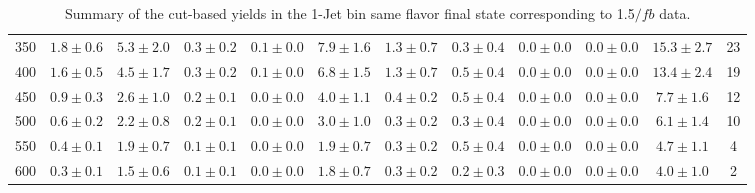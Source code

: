 \begin{table}[!hb]
{\begin{center}
\begin{tabular}{l c c c c c c c c c c c }
350 & $1.8\pm0.6$ & $5.3\pm2.0$ & $0.3\pm0.2$ & $0.1\pm0.0$ & $7.9\pm1.6$ & $1.3\pm0.7$ & $0.3\pm0.4$ & $0.0\pm0.0$ & $0.0\pm0.0$ & $15.3\pm2.7$ & 23 \\
400 & $1.6\pm0.5$ & $4.5\pm1.7$ & $0.3\pm0.2$ & $0.1\pm0.0$ & $6.8\pm1.5$ & $1.3\pm0.7$ & $0.5\pm0.4$ & $0.0\pm0.0$ & $0.0\pm0.0$ & $13.4\pm2.4$ & 19 \\
450 & $0.9\pm0.3$ & $2.6\pm1.0$ & $0.2\pm0.1$ & $0.0\pm0.0$ & $4.0\pm1.1$ & $0.4\pm0.2$ & $0.5\pm0.4$ & $0.0\pm0.0$ & $0.0\pm0.0$ & $7.7\pm1.6$ & 12 \\
500 & $0.6\pm0.2$ & $2.2\pm0.8$ & $0.2\pm0.1$ & $0.0\pm0.0$ & $3.0\pm1.0$ & $0.3\pm0.2$ & $0.3\pm0.4$ & $0.0\pm0.0$ & $0.0\pm0.0$ & $6.1\pm1.4$ & 10 \\
550 & $0.4\pm0.1$ & $1.9\pm0.7$ & $0.1\pm0.1$ & $0.0\pm0.0$ & $1.9\pm0.7$ & $0.3\pm0.2$ & $0.5\pm0.4$ & $0.0\pm0.0$ & $0.0\pm0.0$ & $4.7\pm1.1$ & 4 \\
600 & $0.3\pm0.1$ & $1.5\pm0.6$ & $0.1\pm0.1$ & $0.0\pm0.0$ & $1.8\pm0.7$ & $0.3\pm0.2$ & $0.2\pm0.3$ & $0.0\pm0.0$ & $0.0\pm0.0$ & $4.0\pm1.0$ & 2 \\
\hline
\end{tabular}
\end{center}
}
\caption{Summary of the cut-based yields in the 1-Jet bin same flavor final state corresponding to 1.5$/fb$ data.}
\end{table}
